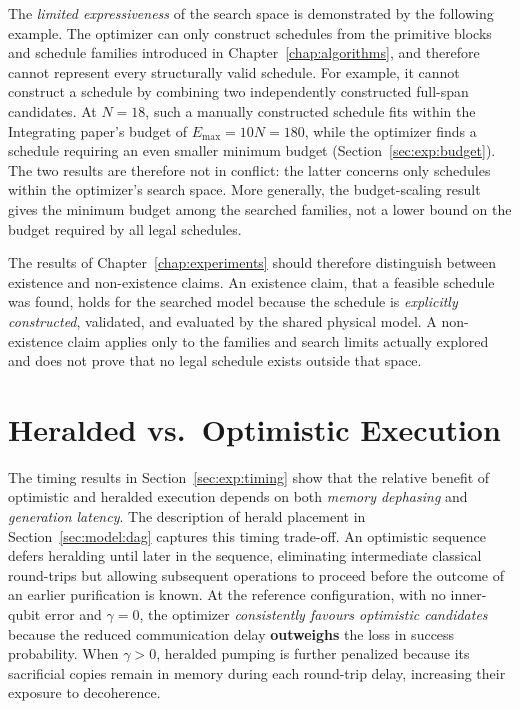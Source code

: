 The \emph{limited expressiveness} of the search space is demonstrated by the following example. The optimizer can only construct schedules from the primitive blocks and schedule families introduced in Chapter~\ref{chap:algorithms}, and therefore cannot represent every structurally valid schedule. For example, it cannot construct a schedule by combining two independently constructed full-span candidates. At $N=18$, such a manually constructed schedule fits within the Integrating paper's budget of $E_{\max}=10N=180$, while the optimizer finds a schedule requiring an even smaller minimum budget (Section~\ref{sec:exp:budget}). The two results are therefore not in conflict: the latter concerns only schedules within the optimizer's search space. More generally, the budget-scaling result gives the minimum budget among the searched families, not a lower bound on the budget required by all legal schedules.

The results of Chapter~\ref{chap:experiments} should therefore distinguish between existence and non-existence claims. An existence claim, that a feasible schedule was found, holds for the searched model because the schedule is \emph{explicitly constructed}, validated, and evaluated by the shared physical model. A non-existence claim applies only to the families and search limits actually explored and does not prove that no legal schedule exists outside that space.

\section{Heralded vs.\ Optimistic Execution}
\label{sec:disc:optimistic}


The timing results in Section~\ref{sec:exp:timing} show that the relative benefit of optimistic and heralded execution depends on both \emph{memory dephasing} and \emph{generation latency}. The description of herald placement in Section~\ref{sec:model:dag} captures this timing trade-off. An optimistic sequence defers heralding until later in the sequence, eliminating intermediate classical round-trips but allowing subsequent operations to proceed before the outcome of an earlier purification is known. At the reference configuration, with no inner-qubit error and $\gamma=0$, the optimizer \emph{consistently favours optimistic candidates} because the reduced communication delay \textbf{outweighs} the loss in success probability. When $\gamma>0$, heralded pumping is further penalized because its sacrificial copies remain in memory during each round-trip delay, increasing their exposure to decoherence.

